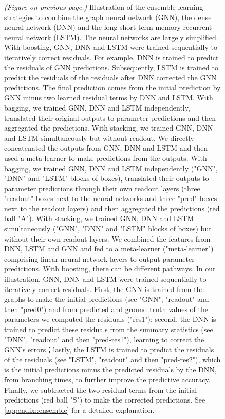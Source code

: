 {\begin{figure}
    \centering
    \caption{\emph{(Figure on previous page.)} Illustration of the ensemble learning strategies to combine the graph neural network (GNN), the dense neural network (DNN) and the long short-term memory recurrent neural network (LSTM). The neural networks are largely simplified. With boosting, GNN, DNN and LSTM were trained sequentially to iteratively correct residuals. For example, DNN is trained to predict the residuals of GNN predictions. Subsequently, LSTM is trained to predict the residuals of the residuals after DNN corrected the GNN predictions. The final prediction comes from the initial prediction by GNN minus two learned residual terms by DNN and LSTM. With bagging, we trained GNN, DNN and LSTM independently, translated their original outputs to parameter predictions and then aggregated the predictions. With stacking, we trained GNN, DNN and LSTM simultaneously but without readout. We directly concatenated the outputs from GNN, DNN and LSTM and then used a meta-learner to make predictions from the outputs. With bagging, we trained GNN, DNN and LSTM independently ("GNN", "DNN" and "LSTM" blocks of boxes), translated their outputs to parameter predictions through their own readout layers (three "readout" boxes next to the neural networks and three "pred" boxes next to the readout layers) and then aggregated the predictions (red ball "A"). With stacking, we trained GNN, DNN and LSTM simultaneously ("GNN", "DNN" and "LSTM" blocks of boxes) but without their own readout layers. We combined the features from DNN, LSTM and GNN and fed to a meta-learner ("meta-learner") comprising linear neural network layers to output parameter predictions. With boosting, there can be different pathways. In our illustration, GNN, DNN and LSTM were trained sequentially to iteratively correct residuals. First, the GNN is trained from the graphs to make the initial predictions (see "GNN", "readout" and then "pred0") and from predicted and ground truth values of the parameters we computed the residuals ("res1"); second, the DNN is trained to predict these residuals from the summary statistics (see "DNN", "readout" and then "pred-res1"), learning to correct the GNN's errors；lastly, the LSTM is trained to predict the residuals of the residuals (see "LSTM", "readout" and then "pred-res2"), which is the initial predictions minus the predicted residuals by the DNN, from branching times, to further improve the predictive accuracy. Finally, we subtracted the two residual terms from the initial predictions (red ball "S") to make the corrected predictions. See \autoref{appendix::ensemble} for a detailed explanation.}
    \label{fig::ensemble}
\end{figure}

}
